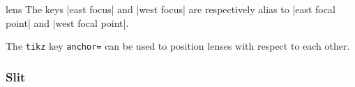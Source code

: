 \documentclass[a4paper]{ltxdoc}
\begin{document}
\begin{shape}{lens}
The keys |east focus| and |west focus| are respectively alias to |east focal point| and |west focal point|.


The \texttt{tikz} key \texttt{anchor=} can be used to position lenses with respect to each other.

\begin{codeexample}[width=6cm]
\end{codeexample}

\end{shape}

\subsubsection{Slit}
\end{document}
